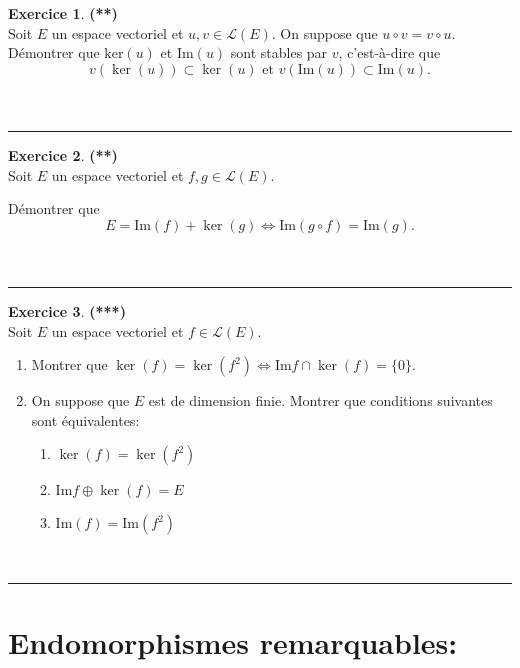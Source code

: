 \documentclass[a4paper,11pt]{article}
\theoremstyle{definition}
\newtheorem{exo}{Exercice} %
\begin{document}
\begin{minipage}{1\linewidth}
\begin{minipage}[t]{0.48\linewidth}
\begin{exo}\textbf{(**)}\quad\\[0.2cm]
Soit $E$ un espace vectoriel et $u,v\in\mathcal L(E)$. On suppose que $u\circ v=v\circ u$. Démontrer que $\textrm{ker}(u)$ et $\textrm{Im}(u)$ sont stables par $v$, c'est-à-dire que\quad\\[-0.4cm]
$$v(\ker (u))\subset \ker (u)\textrm{ et }v(\textrm{Im}(u))\subset \textrm{Im}(u).$$\quad\\[-0.4cm]

\hfill\\[-0.25cm]
\centering\rule{1\linewidth}{0.6pt}\end{exo}


\begin{exo}\textbf{(**)}\quad\\[0.2cm]
Soit $E$ un espace vectoriel et $f,g\in\mathcal L(E)$.

Démontrer que \\[-0.8cm]
$$E=\textrm{Im}(f)+\ker(g)\iff \textrm{Im}(g\circ f)=\textrm{Im}(g).$$\quad\\[-0.4cm]
\hfill\\[-0.25cm]
\centering\rule{1\linewidth}{0.6pt}\end{exo}


\begin{exo}\textbf{(***)}\quad\\[0.2cm]
Soit $E$ un espace vectoriel et $f\in\mathcal L(E)$.
\begin{enumerate}
	\item Montrer que
	$\ker(f)=\ker(f^2)\iff \textrm{Im}f\cap\ker(f)=\{0\}.$

	\item On suppose que $E$ est de dimension finie. Montrer que conditions suivantes sont équivalentes:
	\begin{enumerate}[$\square$]
		\item $\ker(f)=\ker(f^2)$
		\item $\textrm{Im}f\oplus \ker(f)=E$
		\item $\textrm{Im}(f)=\textrm{Im}(f^2)$
\end{enumerate}\end{enumerate}
\hfill\\[-0.25cm]
\centering\rule{1\linewidth}{0.6pt}\end{exo}


\end{minipage}\end{minipage}\newpage


\section*{Endomorphismes remarquables:}\hfill\\%
\end{document}
